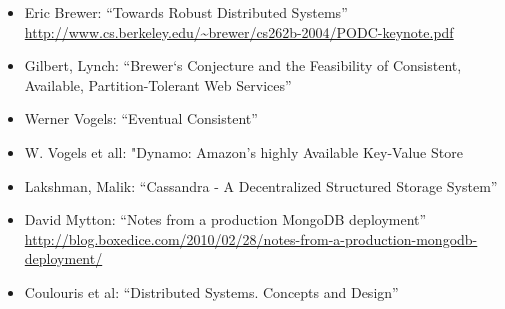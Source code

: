 \documentclass{llncs}
\begin{document}
\begin{itemize}
\item
  Eric Brewer: ``Towards Robust Distributed Systems''
  \url{http://www.cs.berkeley.edu/~brewer/cs262b-2004/PODC-keynote.pdf}
\item
  Gilbert, Lynch:
  ``Brewer‘s Conjecture and the Feasibility of Consistent, Available, Partition-Tolerant Web Services''
\item
  Werner Vogels: ``Eventual Consistent''
\item
  W. Vogels et all: "Dynamo: Amazon's highly Available Key-Value
  Store
\item
  Lakshman, Malik:
  ``Cassandra - A Decentralized Structured Storage System''
\item
  David Mytton: ``Notes from a production MongoDB deployment''
  \url{http://blog.boxedice.com/2010/02/28/notes-from-a-production-mongodb-deployment/}
\item
  Coulouris et al: ``Distributed Systems. Concepts and Design''
\end{itemize}
%
%
\begin{thebibliography}{}
%

\end{thebibliography}
\clearpage
{} %
\renewcommand{\indexname}{Author Index}
\printindex
%
\end{document}
